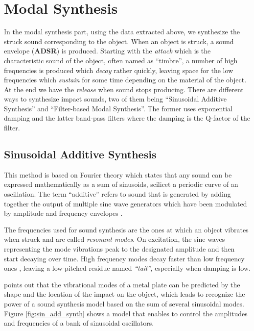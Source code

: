 \section{Modal Synthesis}\label{sec:modal_synth}
In the modal synthesis part, using the data extracted above, we synthesize the struck sound corresponding to the object. When an object is struck, a sound envelope (\textbf{ADSR}) is produced. Starting with the \textit{attack} which is the characteristic sound of the object, often named as ``timbre'', a number of high frequencies is produced which \textit{decay} rather quickly, leaving space for the low frequencies which \textit{sustain} for some time depending on the material of the object. At the end we have the \textit{release} when sound stops producing. There are different ways to synthesize impact sounds, two of them being ``Sinusoidal Additive Synthesis'' and ``Filter-based Modal Synthesis''. The former uses exponential damping and the latter band-pass filters where the damping is the Q-factor of the filter. 

\subsection{Sinusoidal Additive Synthesis}\label{sec:sin_synth}

This method is based on Fourier theory which states that any sound can be expressed mathematically as a sum of sinusoids, scilicet a periodic curve of an oscillation. The term ``additive'' refers to sound that is generated by adding together the output of multiple sine wave generators which have been modulated by amplitude and frequency envelopes \cite{smith2011spectral}.

The frequencies used for sound synthesis are the ones at which an object vibrates when struck and are called \textit{resonant modes}. On excitation, the sine waves representing the mode vibrations peak to the designated amplitude and then start decaying over time. High frequency modes decay faster than low frequency ones \cite{lloyd2011sound}, leaving a low-pitched residue named \textit{``tail''}, especially when damping is low.

\cite{Cook:2002:RSS:515316} points out that the vibrational modes of a  metal plate can be predicted by the shape and the location of the impact on the object, which leads to recognize the power of a sound synthesis model based on the sum of several sinusoidal modes. Figure \ref{fig:sin_add_synth} shows a model that enables to control the amplitudes and frequencies of a bank of sinusoidal oscillators.

